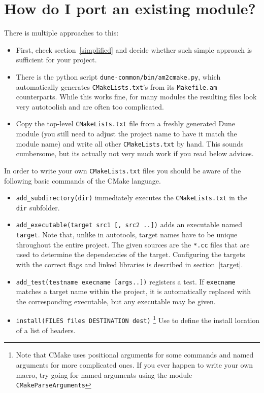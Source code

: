 \documentclass[a4paper,10pt,DIV9,headings=small]{scrartcl}
\begin{document}
\section{How do I port an existing module?}
\label{porting}
There is multiple approaches to this:
\begin{itemize}
 \item First, check section~\ref{simplified} and decide whether such simple approach is sufficient for your project.
 \item There is the python script \lstinline!dune-common/bin/am2cmake.py!, which automatically generates \lstinline!CMakeLists.txt!'s from its \lstinline!Makefile.am! counterparts. While this works fine, for many modules the resulting files look very autotoolish and are often too complicated.
 \item Copy the top-level \lstinline!CMakeLists.txt! file from a freshly generated Dune module (you still need to adjust the project name to have it match the module name) and write all other \lstinline!CMakeLists.txt! by hand. This sounds cumbersome, but its actually not very much work if you read below advices.
\end{itemize}

In order to write your own \lstinline!CMakeLists.txt! files you should be aware of the following basic commands of the CMake language.

\begin{itemize}
 \item \lstinline!add_subdirectory(dir)! immediately executes the \lstinline!CMakeLists.txt! in the \lstinline!dir! subfolder.
 \item \lstinline!add_executable(target src1 [, src2 ..])! adds an executable named \lstinline!target!. Note that, unlike in autotools, target names have to be unique throughout the entire project. The given sources are the \lstinline!*.cc! files that are used to determine the dependencies of the target. Configuring the targets with the correct flags and linked libraries is described in section~\ref{target}.
 \item \lstinline!add_test(testname execname [args..])! registers a test. If \lstinline!execname! matches a target name within the project, it is automatically replaced with the corresponding executable, but any executable may be given.
 \item \lstinline!install(FILES files DESTINATION dest)! \footnote{Note that CMake uses positional arguments for some commands and named arguments for more complicated ones. If you ever happen to write your own macro, try going for named arguments using the module \lstinline!CMakeParseArguments!} Use to define the install location of a list of headers.
\end{itemize}
\end{document}
